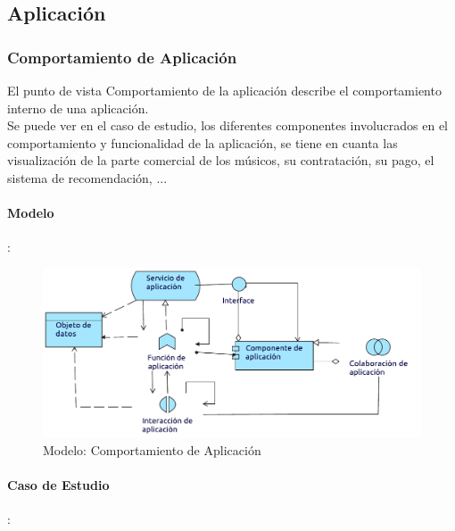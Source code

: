 \subsection{Aplicación}

\subsubsection{Comportamiento de Aplicación}
El punto de vista Comportamiento de la aplicación describe el comportamiento interno de una aplicación.\\

Se puede ver en el caso de estudio, los diferentes componentes involucrados en el comportamiento y funcionalidad de la aplicación, se tiene en cuanta las visualización de la parte comercial de los músicos, su contratación, su pago, el sistema de recomendación, ...
\paragraph{Modelo}:
\begin{figure}[h!]
	\centering
	\includegraphics[width=0.8\linewidth]{Desarrollo/ArquitecturaEmpresarial/Aplicacion/imgs/ComportamientoMetamodelo.pdf}
	\caption{Modelo: Comportamiento de Aplicación}
\end{figure}
\newpage
\paragraph{Caso de Estudio}:

